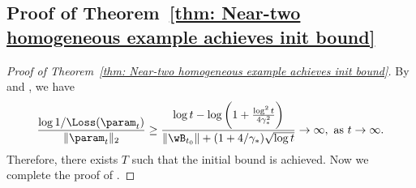 \subsection{Proof of Theorem~\ref{thm: Near-two homogeneous example achieves init bound}}
\begin{proof}[Proof of Theorem~\ref{thm: Near-two homogeneous example achieves init bound}]
By  and , we have 
\[
    \frac{\log 1/\Loss (\param_t)}{\|\param_t\|_2} \ge \frac{\log t - \log \bigg(1 + \frac{\log^2 t}{4 \gamma_*^2} \bigg)}{\|\wB_{t_0} \| + (1+ 4/ \gamma_*) \sqrt{\log t} } \to \infty, \text{ as } t\to \infty.
    \]
    Therefore, there exists $T$ such that the initial bound is achieved. Now we complete the proof of .
\end{proof}





